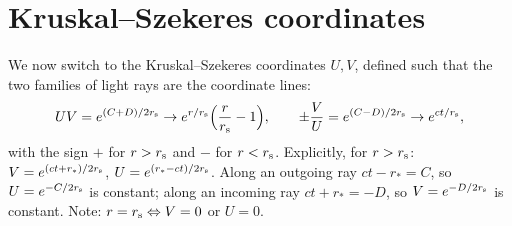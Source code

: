 \section{Kruskal--Szekeres coordinates}

We now switch to the Kruskal--Szekeres coordinates $U,V$, defined such that the two families of light rays are the coordinate lines:
\begin{equation}
  UV=e^{(C+D)/2r_{\mathrm s}}\to e^{r/r_{\mathrm s}}\Big(\frac r{r_{\mathrm s}}-1\Big),\qquad
  \pm\frac VU=e^{(C-D)/2r_{\mathrm s}}\to e^{ct/r_{\mathrm s}},
  \label{eq:kruskal}
\end{equation}
with the sign $+$ for $r>r_{\mathrm s}$ and $-$ for $r<r_{\mathrm s}$. Explicitly, for $r>r_{\mathrm s}$: $V=e^{(ct+r_*)/2r_{\mathrm s}}$, $U=e^{(r_*-ct)/2r_{\mathrm s}}$. Along an outgoing ray $ct-r_*=C$, so $U=e^{-C/2r_{\mathrm s}}$ is constant; along an incoming ray $ct+r_*=-D$, so $V=e^{-D/2r_{\mathrm s}}$ is constant. Note: $r=r_{\mathrm s}\Leftrightarrow V=0$ or $U=0$.

